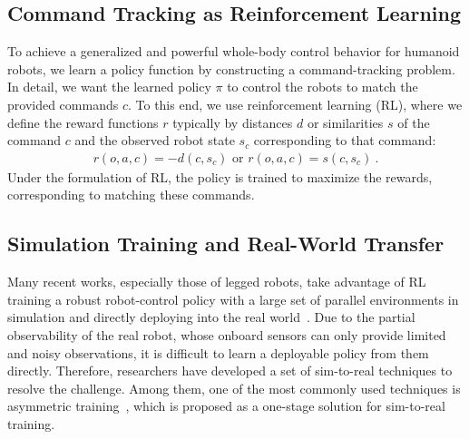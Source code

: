 \subsection{Command Tracking as Reinforcement Learning}
To achieve a generalized and powerful whole-body control behavior for humanoid robots, we learn a policy function by constructing a command-tracking problem. In detail, we want the learned policy $\pi$ to control the robots to match the provided commands $c$. To this end, we use reinforcement learning (RL), where we define the reward functions $r$ typically by distances $d$ or similarities $s$  of the command $c$ and the observed robot state $s_c$ corresponding to that command:
\begin{equation}
\begin{aligned}
r(o, a, c) = -d(c, s_c) \text{ or } r(o, a, c) = s(c, s_c)~.
\end{aligned}
\end{equation}
Under the formulation of RL, the policy is trained to maximize the rewards, corresponding to matching these commands.

\subsection{Simulation Training and Real-World Transfer}
Many recent works, especially those of legged robots, take advantage of RL training a robust robot-control policy with a large set of parallel environments in simulation and directly deploying into the real world~\citep{cheng2024extreme,liu2024visual,he2024hover, sci2024dtc}.
Due to the partial observability of the real robot, whose onboard sensors can only provide limited and noisy observations, it is difficult to learn a deployable policy from them directly. 
Therefore, researchers have developed a set of sim-to-real techniques to resolve the challenge. Among them, one of the most commonly used techniques is asymmetric training~\citep{asyframework,nahrendra2023dreamwaq}, which is proposed as a one-stage solution for sim-to-real training.

